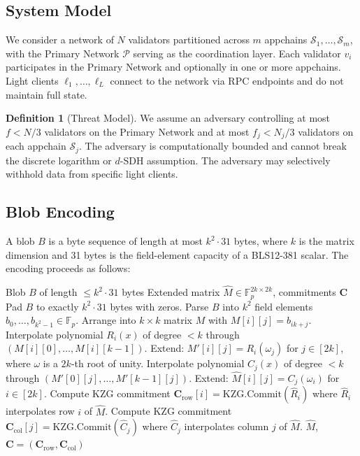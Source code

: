 \documentclass[11pt,a4paper]{article}
\theoremstyle{plain}
\theoremstyle{definition}
\newtheorem{definition}{Definition}[section]
\theoremstyle{remark}
\begin{document}
\subsection{System Model}

We consider a network of $N$ validators partitioned across $m$ appchains
$\mathcal{S}_1, \ldots, \mathcal{S}_m$, with the Primary Network $\mathcal{P}$ serving as
the coordination layer. Each validator $v_i$ participates in the Primary Network and optionally
in one or more appchains. Light clients $\ell_1, \ldots, \ell_L$ connect to the network via
RPC endpoints and do not maintain full state.

\begin{definition}[Threat Model]
We assume an adversary controlling at most $f < N/3$ validators on the Primary Network and at
most $f_j < N_j/3$ validators on each appchain $\mathcal{S}_j$. The adversary is computationally
bounded and cannot break the discrete logarithm or $d$-SDH assumption. The adversary may
selectively withhold data from specific light clients.
\end{definition}

\subsection{Blob Encoding}
\label{sec:protocol:encoding}

A blob $B$ is a byte sequence of length at most $k^2 \cdot 31$ bytes, where $k$ is the matrix
dimension and 31 bytes is the field-element capacity of a BLS12-381 scalar. The encoding
proceeds as follows:

\begin{algorithm}[H]
\caption{Blob Encoding}
\label{alg:blob-encoding}
\begin{algorithmic}[1]
\Require Blob $B$ of length $\leq k^2 \cdot 31$ bytes
\Ensure Extended matrix $\hat{M} \in \mathbb{F}_p^{2k \times 2k}$, commitments $\mathbf{C}$
\State Pad $B$ to exactly $k^2 \cdot 31$ bytes with zeros.
\State Parse $B$ into $k^2$ field elements $b_0, \ldots, b_{k^2-1} \in \mathbb{F}_p$.
\State Arrange into $k \times k$ matrix $M$ with $M[i][j] = b_{ik + j}$.
    \State Interpolate polynomial $R_i(x)$ of degree $< k$ through $(M[i][0], \ldots, M[i][k-1])$.
    \State Extend: $M'[i][j] = R_i(\omega_j)$ for $j \in [2k]$, where $\omega$ is a $2k$-th root of unity.
\EndFor
{}
    \State Interpolate polynomial $C_j(x)$ of degree $< k$ through $(M'[0][j], \ldots, M'[k-1][j])$.
    \State Extend: $\hat{M}[i][j] = C_j(\omega_i)$ for $i \in [2k]$.
\EndFor
{}
    \State Compute KZG commitment $\mathbf{C}_{\text{row}}[i] = \text{KZG.Commit}(\hat{R}_i)$ where
           $\hat{R}_i$ interpolates row $i$ of $\hat{M}$.
\EndFor
{}
    \State Compute KZG commitment $\mathbf{C}_{\text{col}}[j] = \text{KZG.Commit}(\hat{C}_j)$ where
           $\hat{C}_j$ interpolates column $j$ of $\hat{M}$.
\EndFor
\State \Return $\hat{M}$, $\mathbf{C} = (\mathbf{C}_{\text{row}}, \mathbf{C}_{\text{col}})$
\end{algorithmic}
\end{algorithm}
\end{document}
